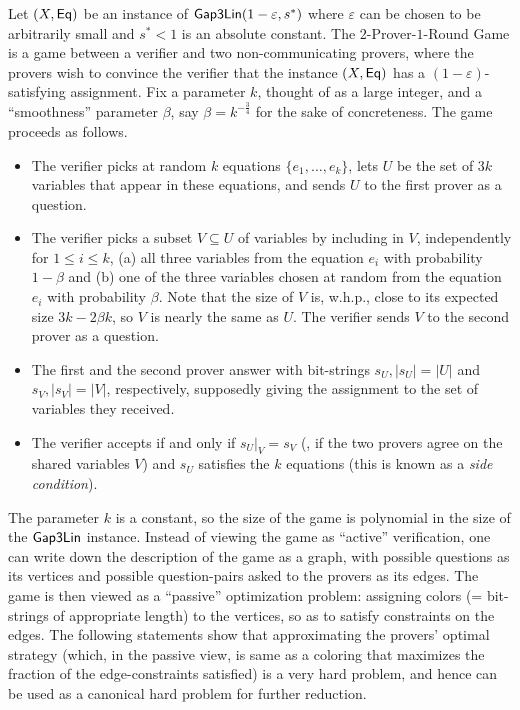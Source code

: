 \documentclass{toc}
\newcommand\eps{\varepsilon}
\renewcommand\leq{\leqslant}
\begin{document}
Let $(X, {\sf Eq})$ be an instance of ${\sf Gap3Lin}(1-\eps, s^*)$ where $\eps$ can be chosen to be arbitrarily small and $s^* < 1$ is an
absolute constant.
The $2$-Prover-$1$-Round Game is a game between a verifier and two non-communicating provers, where
the provers wish to convince the verifier that the instance $(X, {\sf Eq})$ has a $(1-\eps)$-satisfying assignment. Fix a parameter $k$, thought of as a
large integer, and a ``smoothness'' parameter $\beta$, say $\beta = k^{-\frac{3}{4}}$ for the sake of concreteness. The game proceeds as follows. %
%
\begin{itemize}
\item The verifier picks at random $k$ equations $\{e_1,\ldots, e_k \}$, lets $U$
%
be the set of $3k$ variables that appear in these equations, and
      sends $U$ to the first prover as a question.
\item The verifier picks a subset
%
$V \subseteq U$ of variables  %
by including in $V$, independently for $1 \leq i \leq k$,
     (a) all three variables from the equation $e_i$  with probability $1-\beta$ and (b)
      one of the three
      variables chosen at random from the equation $e_i$ with probability $\beta$. Note that the size of $V$ is, w.h.p., close to its
      expected size $3k-2\beta k$, so $V$ is nearly the same as $U$. The verifier sends $V$ to the second prover as a question.
\item %
%
The first and the second prover  %
      answer with bit-strings $s_U, |s_U|=|U|$ and  $s_V, |s_V|=|V|$, respectively, supposedly giving the assignment
      to the set of variables they received.
\item The verifier accepts if and only if $s_U|_V = s_V$ (\ie, if the two provers agree on the shared variables $V$) and  $s_U$ satisfies
      the $k$ equations (this is known as a \emph{side condition}). %
%
\end{itemize}
The parameter $k$ is a constant, so the size of the game
is polynomial in the size of the ${\sf Gap3Lin}$ instance.
Instead of viewing the game as  ``active'' verification, one can write down the description
of the game as a graph, with possible questions as its vertices and possible question-pairs
asked to the provers as its edges.
The game is then viewed as a ``passive'' optimization problem:
assigning colors (= bit-strings of appropriate length) to the vertices, so as to satisfy constraints on the edges.
The following statements show that approximating the provers' optimal strategy (which, in the passive view, is same as a coloring that maximizes
the fraction of the edge-constraints satisfied)
is a very hard problem, and hence can be
used as a canonical hard problem for further reduction.
\end{document}
